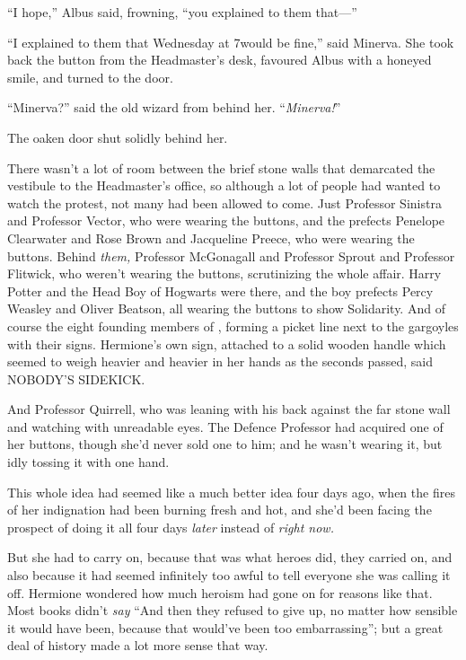 “I hope,” Albus said, frowning, “you explained to them that—”

“I explained to them that Wednesday at 7\pm would be fine,” said Minerva. She took back the button from the Headmaster’s desk, favoured Albus with a honeyed smile, and turned to the door.

“Minerva?” said the old wizard from behind her. “\emph{Minerva!}”

The oaken door shut solidly behind her.

\later

There wasn’t a lot of room between the brief stone walls that demarcated the vestibule to the Headmaster’s office, so although a lot of people had wanted to watch the protest, not many had been allowed to come. Just Professor Sinistra and Professor Vector, who were wearing the buttons, and the prefects Penelope Clearwater and Rose Brown and Jacqueline Preece, who were wearing the buttons. Behind \emph{them,} Professor McGonagall and Professor Sprout and Professor Flitwick, who weren’t wearing the buttons, scrutinizing the whole affair. Harry Potter and the Head Boy of Hogwarts were there, and the boy prefects Percy Weasley and Oliver Beatson, all wearing the buttons to show Solidarity. And of course the eight founding members of \SPHEW, forming a picket line next to the gargoyles with their signs. Hermione’s own sign, attached to a solid wooden handle which seemed to weigh heavier and heavier in her hands as the seconds passed, said NOBODY’S SIDEKICK.

And Professor Quirrell, who was leaning with his back against the far stone wall and watching with unreadable eyes. The Defence Professor had acquired one of her buttons, though she’d never sold one to him; and he wasn’t wearing it, but idly tossing it with one hand.

This whole idea had seemed like a much better idea four days ago, when the fires of her indignation had been burning fresh and hot, and she’d been facing the prospect of doing it all four days \emph{later} instead of \emph{right now.}

But she had to carry on, because that was what heroes did, they carried on, and also because it had seemed infinitely too awful to tell everyone she was calling it off. Hermione wondered how much heroism had gone on for reasons like that. Most books didn’t \emph{say} “And then they refused to give up, no matter how sensible it would have been, because that would’ve been too embarrassing”; but a great deal of history made a lot more sense that way.

